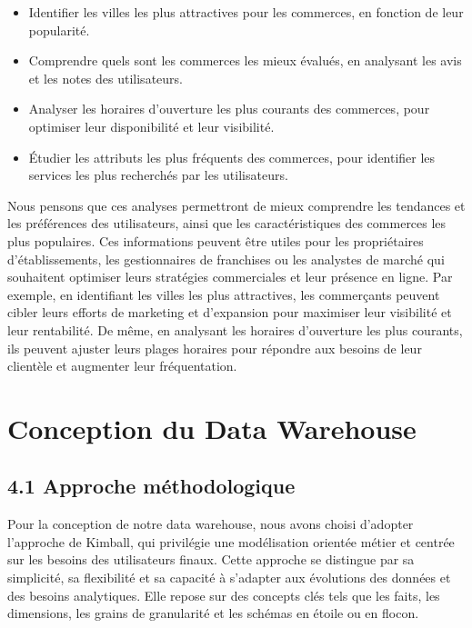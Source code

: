 \begin{itemize}
\item Identifier les villes les plus attractives pour les commerces, en fonction de leur popularité.
\item Comprendre quels sont les commerces les mieux évalués, en analysant les avis et les notes des utilisateurs.
\item Analyser les horaires d’ouverture les plus courants des commerces, pour optimiser leur disponibilité et leur visibilité.
\item Étudier les attributs les plus fréquents des commerces, pour identifier les services les plus recherchés par les utilisateurs.
\end{itemize}

Nous pensons que ces analyses permettront de mieux comprendre les tendances et les préférences des utilisateurs, ainsi que les caractéristiques des commerces les plus populaires. Ces informations peuvent être utiles pour les propriétaires d’établissements, les gestionnaires de franchises ou les analystes de marché qui souhaitent optimiser leurs stratégies commerciales et leur présence en ligne.
Par exemple, en identifiant les villes les plus attractives, les commerçants peuvent cibler leurs efforts de marketing et d’expansion pour maximiser leur visibilité et leur rentabilité. De même, en analysant les horaires d’ouverture les plus courants, ils peuvent ajuster leurs plages horaires pour répondre aux besoins de leur clientèle et augmenter leur fréquentation.

\chapter*{Conception du Data Warehouse}


\section*{4.1 Approche méthodologique}

Pour la conception de notre data warehouse, nous avons choisi d’adopter l'approche de Kimball, qui privilégie une modélisation orientée métier et centrée sur les besoins des utilisateurs finaux.
Cette approche se distingue par sa simplicité, sa flexibilité et sa capacité à s’adapter aux évolutions des données et des besoins analytiques.
Elle repose sur des concepts clés tels que les faits, les dimensions, les grains de granularité et les schémas en étoile ou en flocon.

